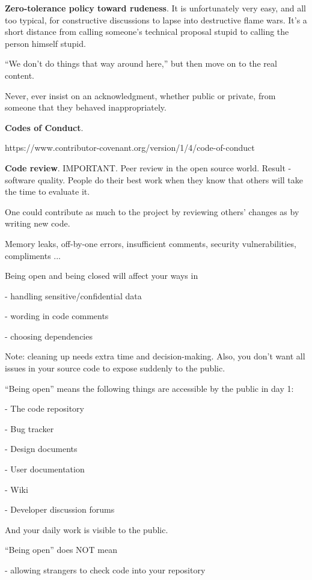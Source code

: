 \documentclass[landscape,30pt]{foils}
\begin{document}
{\bf Zero-tolerance policy toward rudeness}.  It is unfortunately very
easy, and all too typical, for constructive discussions to lapse into
destructive flame wars.  It's a short distance from calling someone's
technical proposal stupid to calling the person himself stupid.

``We don't do things that way around here,'' but then move on to the
real content.

Never, ever insist on an acknowledgment, whether public
or private, from someone that they behaved inappropriately.

{\bf Codes of Conduct}.

https://www.contributor-covenant.org/version/1/4/code-of-conduct

{\bf Code review}.  IMPORTANT.  Peer review in the open source world.
Result - software quality.  People do their best work when they know
that others will take the time to evaluate it.

One could contribute as much to the project by reviewing others'
changes as by writing new code.

Memory leaks, off-by-one errors, insufficient comments, security vulnerabilities, compliments ...


Being open and being closed will affect your ways in

- handling sensitive/confidential data

- wording in code comments

- choosing dependencies 

Note: cleaning up needs extra time and decision-making.  Also, you don't want all issues in your source code to expose suddenly to the public.

``Being open'' means the following things are accessible by the public in day 1:

- The code repository

- Bug tracker

- Design documents

- User documentation

- Wiki

- Developer discussion forums

And your daily work is visible to the public.

\newpage
``Being open'' does NOT mean

- allowing strangers to check code into your repository
\end{document}
